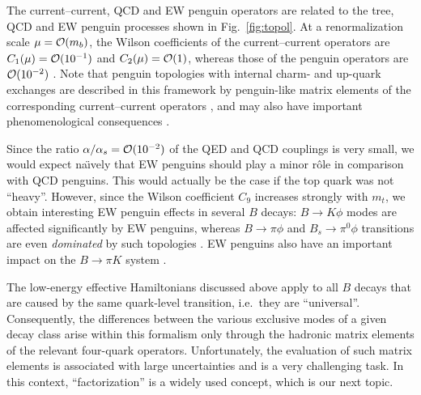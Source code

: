 \documentclass[11pt]{cernrep}
\begin{document}
The current--current, QCD and EW penguin operators are related to the tree, 
QCD and EW penguin processes shown in 
Fig.~\ref{fig:topol}. At a renormalization scale
$\mu={\cal O}(m_b)$, the Wilson coefficients of the current--current operators
are $C_1(\mu)={\cal O}(10^{-1})$ and $C_2(\mu)={\cal O}(1)$, whereas those
of the penguin operators are ${\cal O}(10^{-2})$ \cite{B-LH98,BBL-rev}. 
Note that penguin 
topologies with internal charm- and up-quark exchanges \cite{BSS}
are described in this framework by penguin-like matrix elements of 
the corresponding current--current operators \cite{RF-DIPL}, and 
may also have important phenomenological consequences \cite{BF-PEN,CHARM-PEN}.

Since the ratio $\alpha/\alpha_s={\cal O}(10^{-2})$ of the QED and QCD 
couplings is very small, we would expect na\"\i vely that EW penguins 
should play a minor r\^ole in comparison with QCD penguins. This would 
actually be the case if the top quark was not ``heavy''. However, since 
the Wilson coefficient $C_9$ increases strongly with $m_t$, we obtain 
interesting EW penguin effects in several $B$ decays: $B\to K\phi$ 
modes are affected significantly by EW penguins, whereas $B\to\pi\phi$ 
and $B_s\to\pi^0\phi$ transitions are even {\it dominated} by such 
topologies \cite{RF-EWP,RF-rev}. EW penguins also have an important 
impact on the $B\to\pi K$ system \cite{EWP-BpiK}.

The low-energy effective Hamiltonians discussed above apply to all 
$B$ decays that are caused by the same quark-level transition, i.e.\ 
they are ``universal''. Consequently, the differences between the 
various exclusive modes of a given decay class arise within this formalism 
only through the hadronic matrix elements of the relevant four-quark 
operators. Unfortunately, the evaluation of such matrix elements is 
associated with large uncertainties and is a very challenging task. In this 
context, ``factorization'' is a widely used concept, which is our next 
topic.


%
%
%
\end{document}

